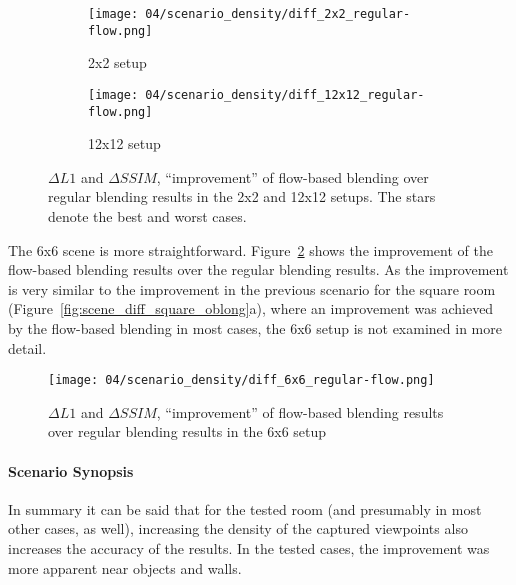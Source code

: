 \begin{figure}
\centering
    \hfill
    \begin{subfigure}[b]{0.4\textwidth}
            \centering
            \texttt{[image: 04/scenario\_density/diff\_2x2\_regular-flow.png]}
            \caption{2x2 setup}
    \end{subfigure}
    \hfill
    \begin{subfigure}[b]{0.4\textwidth}
            \centering
            \texttt{[image: 04/scenario\_density/diff\_12x12\_regular-flow.png]}
            \caption{12x12 setup}
    \end{subfigure}
    \hfill
  \caption[Improvement of flow-based blending results over regular blending results in the 2x2 and 12x12 setups]{$\Delta L1$ and $\Delta SSIM$, ``improvement'' of flow-based blending over regular blending results in the 2x2 and 12x12 setups. The stars denote the best and worst cases.} \label{fig:dens_diff_2x2_12x12}
\end{figure}


The 6x6 scene is more straightforward. Figure~\ref{fig:dens_diff_6x6} shows the improvement of the flow-based blending results over the regular blending results. As the improvement is very similar to the improvement in the previous scenario for the square room (Figure~\ref{fig:scene_diff_square_oblong}a), where an improvement was achieved by the flow-based blending in most cases, the 6x6 setup is not examined in more detail.

\begin{figure}
		\centering
		\texttt{[image: 04/scenario\_density/diff\_6x6\_regular-flow.png]}
		\caption{$\Delta L1$ and $\Delta SSIM$, ``improvement'' of flow-based blending results over regular blending results in the 6x6 setup}
		\label{fig:dens_diff_6x6}
\end{figure}

\paragraph{Scenario Synopsis}
In summary it can be said that for the tested room (and presumably in most other cases, as well), increasing the density of the captured viewpoints also increases the accuracy of the results. In the tested cases, the improvement was more apparent near objects and walls.

